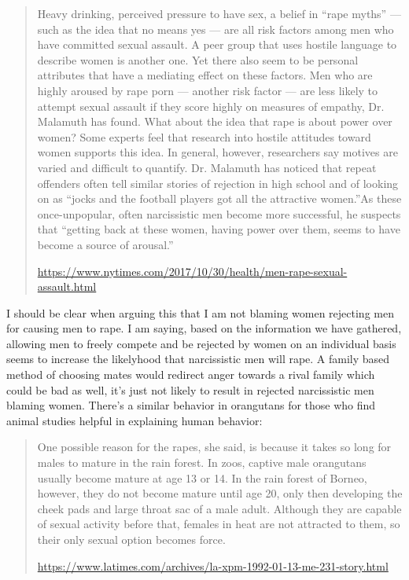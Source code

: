\documentclass[11pt]{article}
\begin{document}
\begin{quote}
Heavy drinking, perceived pressure to have sex, a belief in “rape myths” — such as the idea that no means yes — are all risk factors among men who have committed sexual assault. A peer group that uses hostile language to describe women is another one.
Yet there also seem to be personal attributes that have a mediating effect on these factors. Men who are highly aroused by rape porn — another risk factor — are less likely to attempt sexual assault if they score highly on measures of empathy, Dr. Malamuth has found. What about the idea that rape is about power over women? Some experts feel that research into hostile attitudes toward women supports this idea. In general, however, researchers say motives are varied and difficult to quantify. Dr. Malamuth has noticed that repeat offenders often tell similar stories of rejection in high school and of looking on as “jocks and the football players got all the attractive women.”As these once-unpopular, often narcissistic men become more successful, he suspects that “getting back at these women, having power over them, seems to have become a source of arousal.”

\url{https://www.nytimes.com/2017/10/30/health/men-rape-sexual-assault.html}
\end{quote}

I should be clear when arguing this that I am not blaming women rejecting men for causing men to rape. I am saying, based on the information we have gathered, allowing men to freely compete and be rejected by women on an individual basis seems to increase the likelyhood that narcissistic men will rape. A family based method of choosing mates would redirect anger towards a rival family which could be bad as well, it’s just not likely to result in rejected narcissistic men blaming women. There’s a similar behavior in orangutans for those who find animal studies helpful in explaining human behavior:
\begin{quote}
One possible reason for the rapes, she said, is because it takes so long for males to mature in the rain forest. In zoos, captive male orangutans usually become mature at age 13 or 14. In the rain forest of Borneo, however, they do not become mature until age 20, only then developing the cheek pads and large throat sac of a male adult. Although they are capable of sexual activity before that, females in heat are not attracted to them, so their only sexual option becomes force.

\url{https://www.latimes.com/archives/la-xpm-1992-01-13-me-231-story.html}
\end{quote}
\end{document}

